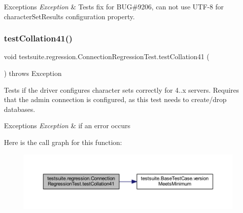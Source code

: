 \begin{DoxyExceptions}{Exceptions}
{\em Exception} & Tests fix for B\+UG\#9206, can not use \textquotesingle{}U\+T\+F-\/8\textquotesingle{} for character\+Set\+Results configuration property. \\
\hline
\end{DoxyExceptions}
\mbox{\label{classtestsuite_1_1regression_1_1_connection_regression_test_a8bca083f14a9aedf92ba2d80fd44a71f}} 
\subsubsection{\texorpdfstring{test\+Collation41()}{testCollation41()}}
{\footnotesize\ttfamily void testsuite.\+regression.\+Connection\+Regression\+Test.\+test\+Collation41 (\begin{DoxyParamCaption}{ }\end{DoxyParamCaption}) throws Exception}

Tests if the driver configures character sets correctly for 4..\+x servers. Requires that the \textquotesingle{}admin connection\textquotesingle{} is configured, as this test needs to create/drop databases.


\begin{DoxyExceptions}{Exceptions}
{\em Exception} & if an error occurs \\
\hline
\end{DoxyExceptions}
Here is the call graph for this function\+:
\nopagebreak
\begin{figure}[H]
\begin{center}
\leavevmode
\includegraphics[width=350pt]{classtestsuite_1_1regression_1_1_connection_regression_test_a8bca083f14a9aedf92ba2d80fd44a71f_cgraph}
\end{center}
\end{figure}
\mbox{\label{classtestsuite_1_1regression_1_1_connection_regression_test_ab031515e8ccff3b5b929eccb92f9ca64}} 
